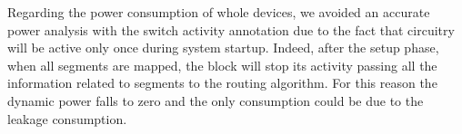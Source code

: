 Regarding the power consumption of whole \disr{} devices, 
we avoided an accurate power analysis with the switch activity
annotation due to the fact that \disr{} circuitry will be active 
only once during system startup. Indeed, after the setup phase, 
when all segments are mapped, the \disr{} block will stop its activity 
passing all the information related to segments to the routing
algorithm. For this reason the dynamic power falls to zero and
the only consumption could be due to the leakage
consumption.
